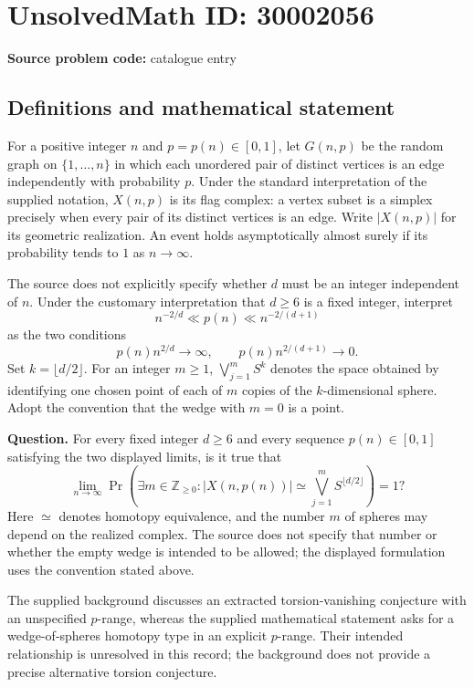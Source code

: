 \documentclass[11pt]{article}
\begin{document}
\section*{UnsolvedMath ID: 30002056}
\textbf{Source problem code:} catalogue entry
\subsection{Definitions and mathematical statement}
For a positive integer \(n\) and \(p=p(n)\in[0,1]\), let \(G(n,p)\) be the random graph on \(\{1,\ldots,n\}\) in which each unordered pair of distinct vertices is an edge independently with probability \(p\). Under the standard interpretation of the supplied notation, \(X(n,p)\) is its flag complex: a vertex subset is a simplex precisely when every pair of its distinct vertices is an edge. Write \(|X(n,p)|\) for its geometric realization. An event holds asymptotically almost surely if its probability tends to \(1\) as \(n\to\infty\).

The source does not explicitly specify whether \(d\) must be an integer independent of \(n\). Under the customary interpretation that \(d\geq6\) is a fixed integer, interpret
\[
 n^{-2/d}\ll p(n)\ll n^{-2/(d+1)}
\]
as the two conditions
\[
 p(n)n^{2/d}\longrightarrow\infty,
 \qquad
 p(n)n^{2/(d+1)}\longrightarrow0.
\]
Set \(k=\lfloor d/2\rfloor\). For an integer \(m\geq1\), \(\bigvee_{j=1}^{m}S^k\) denotes the space obtained by identifying one chosen point of each of \(m\) copies of the \(k\)-dimensional sphere. Adopt the convention that the wedge with \(m=0\) is a point.

\textbf{Question.} For every fixed integer \(d\geq6\) and every sequence \(p(n)\in[0,1]\) satisfying the two displayed limits, is it true that
\[
 \lim_{n\to\infty}
 \Pr\!\left(
   \exists m\in\mathbb Z_{\geq0}:
   |X(n,p(n))|\simeq\bigvee_{j=1}^{m}S^{\lfloor d/2\rfloor}
 \right)=1?
\]
Here \(\simeq\) denotes homotopy equivalence, and the number \(m\) of spheres may depend on the realized complex. The source does not specify that number or whether the empty wedge is intended to be allowed; the displayed formulation uses the convention stated above.

The supplied background discusses an extracted torsion-vanishing conjecture with an unspecified \(p\)-range, whereas the supplied mathematical statement asks for a wedge-of-spheres homotopy type in an explicit \(p\)-range. Their intended relationship is unresolved in this record; the background does not provide a precise alternative torsion conjecture.
\end{document}
